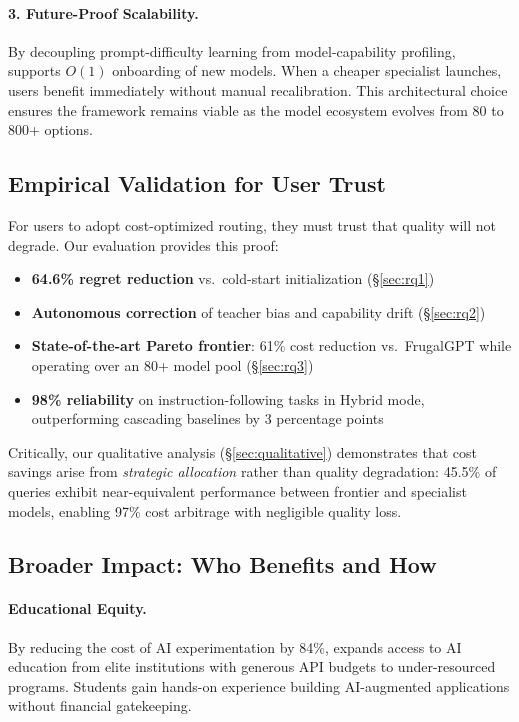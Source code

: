 \paragraph{3. Future-Proof Scalability.}
By decoupling prompt-difficulty learning from model-capability profiling, \ours{} supports $O(1)$ onboarding of new models. When a cheaper specialist launches, users benefit immediately without manual recalibration. This architectural choice ensures the framework remains viable as the model ecosystem evolves from 80 to 800+ options.

\subsection{Empirical Validation for User Trust}

For users to adopt cost-optimized routing, they must trust that quality will not degrade. Our evaluation provides this proof:

\begin{itemize}[leftmargin=*]
    \item \textbf{64.6\% regret reduction} vs.\ cold-start initialization (\S\ref{sec:rq1})
    \item \textbf{Autonomous correction} of teacher bias and capability drift (\S\ref{sec:rq2})
    \item \textbf{State-of-the-art Pareto frontier}: 61\% cost reduction vs.\ FrugalGPT while operating over an 80+ model pool (\S\ref{sec:rq3})
    \item \textbf{98\% reliability} on instruction-following tasks in Hybrid mode, outperforming cascading baselines by 3 percentage points
\end{itemize}

Critically, our qualitative analysis (\S\ref{sec:qualitative}) demonstrates that cost savings arise from \emph{strategic allocation} rather than quality degradation: 45.5\% of queries exhibit near-equivalent performance between frontier and specialist models, enabling 97\% cost arbitrage with negligible quality loss.

\subsection{Broader Impact: Who Benefits and How}

\paragraph{Educational Equity.} By reducing the cost of AI experimentation by 84\%, \ours{} expands access to AI education from elite institutions with generous API budgets to under-resourced programs. Students gain hands-on experience building AI-augmented applications without financial gatekeeping.


